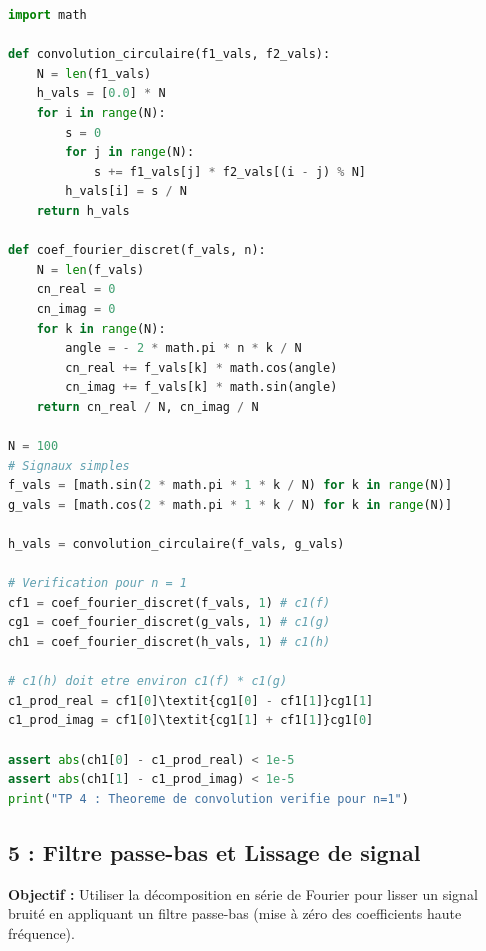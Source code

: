 \documentclass[12pt,a4paper]{article}
\begin{document}
\begin{lstlisting}[language=Python]
import math

def convolution_circulaire(f1_vals, f2_vals):
    N = len(f1_vals)
    h_vals = [0.0] * N
    for i in range(N):
        s = 0
        for j in range(N):
            s += f1_vals[j] * f2_vals[(i - j) % N]
        h_vals[i] = s / N
    return h_vals

def coef_fourier_discret(f_vals, n):
    N = len(f_vals)
    cn_real = 0
    cn_imag = 0
    for k in range(N):
        angle = - 2 * math.pi * n * k / N
        cn_real += f_vals[k] * math.cos(angle)
        cn_imag += f_vals[k] * math.sin(angle)
    return cn_real / N, cn_imag / N

N = 100
# Signaux simples
f_vals = [math.sin(2 * math.pi * 1 * k / N) for k in range(N)]
g_vals = [math.cos(2 * math.pi * 1 * k / N) for k in range(N)]

h_vals = convolution_circulaire(f_vals, g_vals)

# Verification pour n = 1
cf1 = coef_fourier_discret(f_vals, 1) # c1(f)
cg1 = coef_fourier_discret(g_vals, 1) # c1(g)
ch1 = coef_fourier_discret(h_vals, 1) # c1(h)

# c1(h) doit etre environ c1(f) * c1(g)
c1_prod_real = cf1[0]\textit{cg1[0] - cf1[1]}cg1[1]
c1_prod_imag = cf1[0]\textit{cg1[1] + cf1[1]}cg1[0]

assert abs(ch1[0] - c1_prod_real) < 1e-5
assert abs(ch1[1] - c1_prod_imag) < 1e-5
print("TP 4 : Theoreme de convolution verifie pour n=1")
\end{lstlisting}

\subsection*{5 : Filtre passe-bas et Lissage de signal}

\textbf{Objectif :} Utiliser la décomposition en série de Fourier pour lisser un signal bruité en appliquant un filtre passe-bas (mise à zéro des coefficients haute fréquence).
\end{document}
